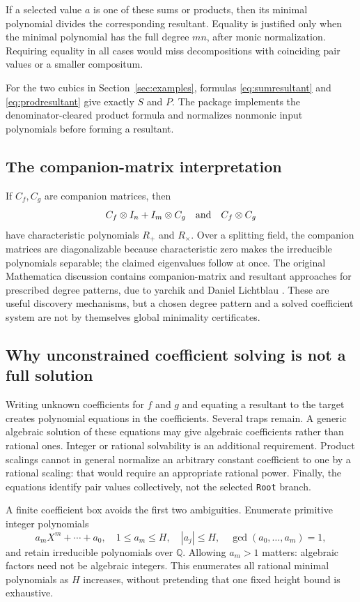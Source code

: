 \documentclass[11pt,a4paper]{article}
\theoremstyle{definition}\newtheorem{definition}[theorem]{Definition}
\theoremstyle{remark}\newtheorem{remark}[theorem]{Remark}
\newcommand{\Q}{\mathbb Q}\newcommand{\C}{\mathbb C}\newcommand{\Z}{\mathbb Z}
\newcommand{\wl}[1]{\texttt{#1}}
\begin{document}
If a selected value $a$ is one of these sums or products, then its minimal polynomial divides the corresponding resultant. Equality is justified only when the minimal polynomial has the full degree $mn$, after monic normalization. Requiring equality in all cases would miss decompositions with coinciding pair values or a smaller compositum.

For the two cubics in Section~\ref{sec:examples}, formulas \eqref{eq:sumresultant} and \eqref{eq:prodresultant} give exactly $S$ and $P$. The package implements the denominator-cleared product formula and normalizes nonmonic input polynomials before forming a resultant.

\subsection{The companion-matrix interpretation}
If $C_f,C_g$ are companion matrices, then
\[
 C_f\otimes I_n+I_m\otimes C_g
 \quad\hbox{and}\quad C_f\otimes C_g
\]
have characteristic polynomials $R_+$ and $R_\times$. Over a splitting field, the companion matrices are diagonalizable because characteristic zero makes the irreducible polynomials separable; the claimed eigenvalues follow at once. The original Mathematica discussion contains companion-matrix and resultant approaches for prescribed degree patterns, due to yarchik and Daniel Lichtblau \cite{question}. These are useful discovery mechanisms, but a chosen degree pattern and a solved coefficient system are not by themselves global minimality certificates.

\subsection{Why unconstrained coefficient solving is not a full solution}
Writing unknown coefficients for $f$ and $g$ and equating a resultant to the target creates polynomial equations in the coefficients. Several traps remain. A generic algebraic solution of these equations may give algebraic coefficients rather than rational ones. Integer or rational solvability is an additional requirement. Product scalings cannot in general normalize an arbitrary constant coefficient to one by a rational scaling: that would require an appropriate rational power. Finally, the equations identify pair values collectively, not the selected \wl{Root} branch.

A finite coefficient box avoids the first two ambiguities. Enumerate primitive integer polynomials
\[
 a_m X^m+\cdots+a_0,
 \quad 1\le a_m\le H,\quad |a_j|\le H,
 \quad \gcd(a_0,\ldots,a_m)=1,
\]
and retain irreducible polynomials over $\Q$. Allowing $a_m>1$ matters: algebraic factors need not be algebraic integers. This enumerates all rational minimal polynomials as $H$ increases, without pretending that one fixed height bound is exhaustive.
\end{document}
